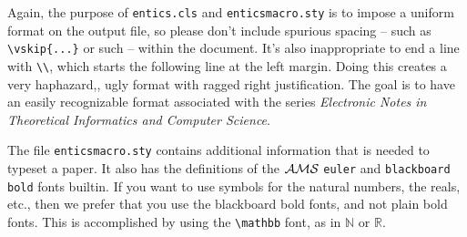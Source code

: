 \documentclass[twoside,11pt]{entics}
\newcommand{\Nat}{{\mathbb N}}
\newcommand{\Real}{{\mathbb R}}
\begin{document}
Again, the purpose of \texttt{entics.cls} and \texttt{enticsmacro.sty} is to
impose a uniform format on the output file, so please don't include spurious
spacing -- such as \verb+\vskip{...}+ or such -- within the document. It's also
inappropriate to end a line with \verb+\\+, which starts the following line at
the left margin. Doing this creates a very haphazard,, ugly format with ragged
right justification. The goal is to have an easily recognizable format
associated with the series \emph{Electronic Notes in Theoretical Informatics
  and Computer Science}.


The file \texttt{enticsmacro.sty} contains additional information that is
needed to typeset a paper. It also has the definitions of the $\cal AMS$
\texttt{euler} and \texttt{blackboard bold} fonts builtin. If you want to use
symbols for the natural numbers, the reals, etc., then we prefer that you use
the blackboard bold fonts, and not plain bold fonts. This is accomplished by
using the \verb+\mathbb+ font, as in $\Nat$ or $\Real$.
\end{document}
